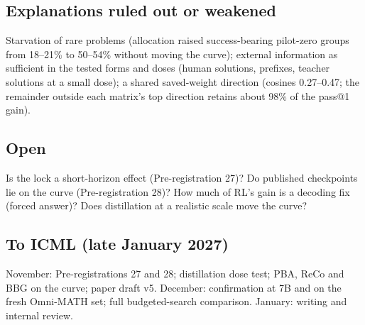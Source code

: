 \documentclass[11pt]{article}
\begin{document}
\subsection{Explanations ruled out or weakened}
Starvation of rare problems (allocation raised success-bearing pilot-zero groups from 18--21\% to 50--54\% without moving the curve); external information as sufficient in the tested forms and doses (human solutions, prefixes, teacher solutions at a small dose); a shared saved-weight direction (cosines 0.27--0.47; the remainder outside each matrix's top direction retains about 98\% of the pass@1 gain).
\subsection{Open}
Is the lock a short-horizon effect (Pre-registration 27)? Do published checkpoints lie on the curve (Pre-registration 28)? How much of RL's gain is a decoding fix (forced answer)? Does distillation at a realistic scale move the curve?
\subsection{To ICML (late January 2027)}
November: Pre-registrations 27 and 28; distillation dose test; PBA, ReCo and BBG on the curve; paper draft v5. December: confirmation at 7B and on the fresh Omni-MATH set; full budgeted-search comparison. January: writing and internal review.

\appendix
\end{document}
